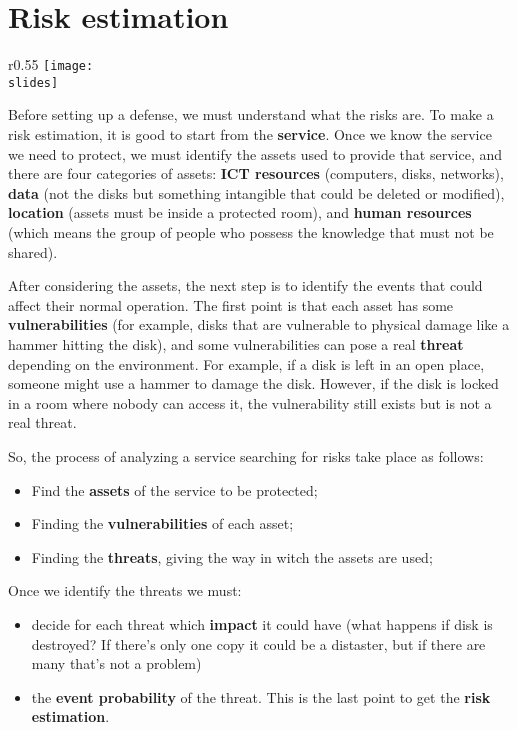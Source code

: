 \section{Risk estimation}

\begin{wrapfigure}{r}{0.55\textwidth}
  \centering
  \texttt{[image: \\slides]}
\end{wrapfigure}

Before setting up a defense, we must understand what the risks are. To make a risk estimation, it is good to start from the \textbf{service}. Once we know the service we need to protect, we must identify the assets used to provide that service, and there are four categories of assets: \textbf{ICT resources} (computers, disks, networks), \textbf{data} (not the disks but something intangible that could be deleted or modified), \textbf{location} (assets must be inside a protected room), and \textbf{human resources} (which means the group of people who possess the knowledge that must not be shared).

After considering the assets, the next step is to identify the events that could affect their normal operation. The first point is that each asset has some \textbf{vulnerabilities} (for example, disks that are vulnerable to physical damage like a hammer hitting the disk), and some vulnerabilities can pose a real \textbf{threat} depending on the environment. For example, if a disk is left in an open place, someone might use a hammer to damage the disk. However, if the disk is locked in a room where nobody can access it, the vulnerability still exists but is not a real threat.

\vspace{5mm}
So, the process of analyzing a service searching for risks take place as follows:
\begin{itemize}[]
  \item Find the \textbf{assets} of the service to be protected;
  \item Finding the \textbf{vulnerabilities} of each asset;
  \item Finding the \textbf{threats}, giving the way in witch the assets are used;
\end{itemize}

\vspace{5mm}
Once we identify the threats we must:
\begin{itemize}
  \item decide for each threat which \textbf{impact} it could have (what happens if disk is destroyed? If there's only one copy it could be a distaster, but if there are many that's not a problem)
  \item the \textbf{event probability} of the threat. This is the last point to get the \textbf{risk estimation}.
\end{itemize}

